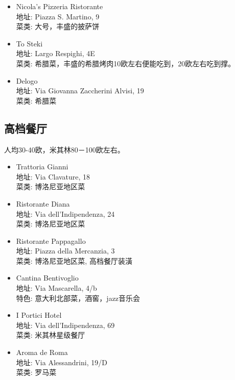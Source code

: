 \begin{itemize}
\begin{itemize}
\begin{itemize}
\item Nicola's Pizzeria Ristorante\\
地址: Piazza S. Martino, 9\\
菜类: 大号，丰盛的披萨饼

\item To Steki\\
地址: Largo Respighi, 4E\\
菜类: 希腊菜，丰盛的希腊烤肉10欧左右便能吃到，20欧左右吃到撑。

\item Delogo\\
地址: Via Giovanna Zaccherini Alvisi, 19\\
菜类: 希腊菜

\end{itemize}

\subsection{高档餐厅}
人均30-40欧，米其林80－100欧左右。

\begin{itemize}
\item Trattoria Gianni\\
地址: Via Clavature, 18\\
菜类: 博洛尼亚地区菜

\item Ristorante Diana\\
地址: Via dell'Indipendenza, 24\\
菜类: 博洛尼亚地区菜

\item Ristorante Pappagallo\\
地址: Piazza della Mercanzia, 3\\
菜类: 博洛尼亚地区菜, 高档餐厅装潢

\item Cantina Bentivoglio\\
地址: Via Mascarella, 4/b\\
特色: 意大利北部菜，酒窖，jazz音乐会

\item I Portici Hotel\\
地址: Via dell'Indipendenza, 69\\
菜类: 米其林星级餐厅

\item Aroma de Roma\\
地址: Via Alessandrini, 19/D\\
菜类: 罗马菜
\end{itemize}


\end{itemize}
\end{itemize}
